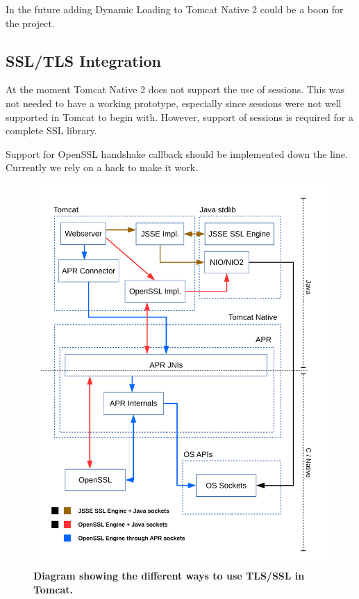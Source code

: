 \documentclass[11pt,a4paper,bibliography=totocnumbered]{scrartcl}
\def\mytitle{Tomcat Native 2}
\begin{document}
In the future adding Dynamic Loading to \mytitle{} could be a boon for the project.

\subsection{SSL/TLS Integration}
At the moment \mytitle{} does not support the use of sessions. This was not needed to have a working prototype, especially since sessions were not well supported in Tomcat to begin with. However, support of sessions is required for a complete SSL library.

Support for OpenSSL handshake callback should be implemented down the line. Currently we rely on a hack to make it work.
\newpage
\printbibliography

\begin{figure}[!h]
	\begin{center}
		\includegraphics[scale=0.7]{diagram_current_way.pdf}
	\end{center}
	\caption{\textbf{Diagram showing the different ways to use TLS/SSL in Tomcat.}}
	\label{fig:current}
\end{figure}
\end{document}
